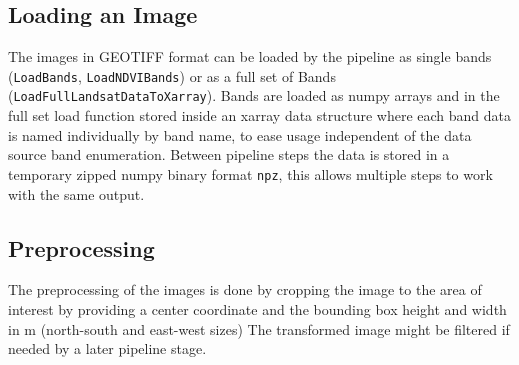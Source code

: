\documentclass[a4paper, english]{article}
\begin{document}
\subsection{Loading an Image} 
The images in GEOTIFF format can be loaded by the pipeline as single bands (\texttt{LoadBands}, \texttt{LoadNDVIBands}) or as a full set of Bands (\texttt{LoadFullLandsatDataToXarray}). 
Bands are loaded as numpy arrays and in the full set load function stored inside an xarray data structure where each band data is named individually by band name, to ease usage independent of the data source band enumeration.
Between pipeline steps the data is stored in a temporary zipped numpy binary format \texttt{npz}, this allows multiple steps to work with the same output.
%
\subsection{Preprocessing}
The preprocessing of the images is done by cropping the image to the area of interest by providing a center coordinate and the bounding box height and width in m (north-south and east-west sizes) 
The transformed image might be filtered if needed by a later pipeline stage. 

%
\end{document}
